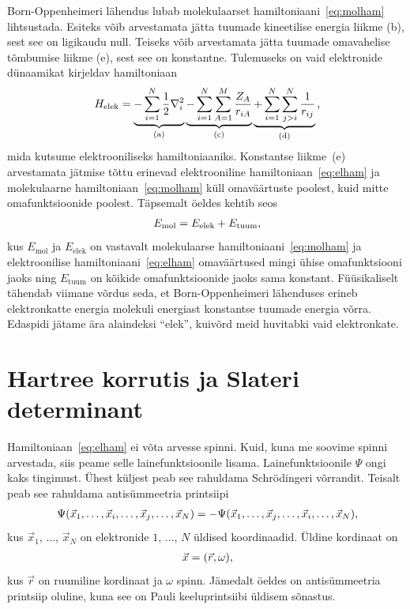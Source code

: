 \documentclass[12pt]{report}
\begin{document}
Born-Oppenheimeri lähendus lubab molekulaarset hamiltoniaani~\eqref{eq:molham} lihtsustada.
Esiteks võib arvestamata jätta tuumade kineetilise energia liikme (b), sest see on ligikaudu null.
Teiseks võib arvestamata jätta tuumade omavahelise tõmbumise liikme (e), sest see on konstantne.
Tulemuseks on vaid elektronide dünaamikat kirjeldav hamiltoniaan
\begin{align}\label{eq:elham}
    H_\text{elek} =
    \underbrace{- \sum_{i = 1}^N \frac{1}{2} \nabla_i^2}_\text{(a)}
    \underbrace{- \sum_{i = 1}^N \sum_{A = 1}^M \frac{Z_A}{r_{iA}}}_\text{(c)}
    \underbrace{+ \sum_{i = 1}^N \sum_{j > i}^N \frac{1}{r_{ij}}}_\text{(d)} \rlap{,}
\end{align}
mida kutsume elektrooniliseks hamiltoniaaniks.
Konstantse liikme~(e) arvestamata jätmise tõttu erinevad elektrooniline hamiltoniaan~\eqref{eq:elham} ja molekulaarne hamiltoniaan~\eqref{eq:molham} küll omaväärtuste poolest, kuid mitte omafunktsioonide poolest.
Täpsemalt öeldes kehtib seos
\begin{align}\label{eq:eigenelvsmol}
    E_\text{mol} = E_\text{elek} + E_\text{tuum} \rlap{,}
\end{align}
kus \(E_\text{mol}\) ja \(E_\text{elek}\) on vastavalt molekulaarse hamiltoniaani~\eqref{eq:molham} ja elektroonilise hamiltoniaani~\eqref{eq:elham} omaväärtused mingi ühise omafunktsiooni jaoks	 ning \(E_\text{tuum}\) on kõikide omafunktsioonide jaoks sama konstant.
Füüsikaliselt tähendab viimane võrdus seda, et Born-Oppenheimeri lähenduses erineb elektronkatte energia molekuli energiast konstantse tuumade energia võrra.
Edaspidi jätame ära alaindeksi ``elek'', kuivõrd meid huvitabki vaid elektronkate.

\section{Hartree korrutis ja Slateri determinant}\label{sec:hpsd}

Hamiltoniaan~\eqref{eq:elham} ei võta arvesse spinni.
Kuid, kuna me soovime spinni arvestada, siis peame selle lainefunktsioonile lisama.
Lainefunktsioonile \(\Psi\) ongi kaks tingimust.
Ühest küljest peab see rahuldama Schrödingeri võrrandit.
Teisalt peab see rahuldama antisümmeetria printsiipi
\begin{align}\label{eq:antisim}
    \Psi(\vec{x}_1, \ldots, \vec{x}_i, \ldots, \vec{x}_j, \ldots, \vec{x}_N) =
    -\Psi(\vec{x}_1, \ldots, \vec{x}_j, \ldots, \vec{x}_i, \ldots, \vec{x}_N) \rlap{,}
\end{align}
kus \(\vec{x}_1\), \(\ldots\), \(\vec{x}_N\) on elektronide \(1\), \(\ldots\), \(N\) üldised koordinaadid.
Üldine kordinaat on
\begin{align}
    \vec{x} = (\vec{r}, \omega) \rlap{,}
\end{align}
kus \(\vec{r}\) on ruumiline kordinaat ja \(\omega\) spinn.
Jämedalt öeldes on antisümmeetria printsiip oluline, kuna see on Pauli keeluprintsiibi üldisem sõnastus.
\end{document}

